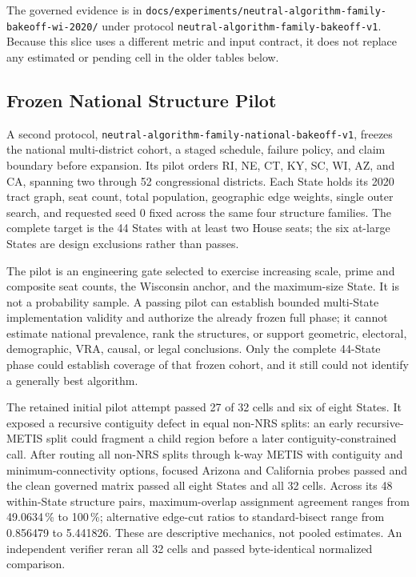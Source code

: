 The governed evidence is in
\nolinkurl{docs/experiments/neutral-algorithm-family-bakeoff-wi-2020/} under
protocol \texttt{neutral-algorithm-family-bakeoff-v1}. Because this slice uses
a different metric and input contract, it does not replace any estimated or
pending cell in the older tables below.

\subsection{Frozen National Structure Pilot}

A second protocol, \texttt{neutral-algorithm-family-national-bakeoff-v1},
freezes the national multi-district cohort, a staged schedule, failure policy,
and claim boundary before expansion. Its pilot orders RI, NE, CT, KY, SC, WI,
AZ, and CA, spanning two through 52 congressional districts. Each State holds
its 2020 tract graph, seat count, total population, geographic edge weights,
single outer search, and requested seed 0 fixed across the same four structure
families. The complete target is the 44 States with at least two House seats;
the six at-large States are design exclusions rather than passes.

The pilot is an engineering gate selected to exercise increasing scale, prime
and composite seat counts, the Wisconsin anchor, and the maximum-size State.
It is not a probability sample. A passing pilot can establish bounded
multi-State implementation validity and authorize the already frozen full
phase; it cannot estimate national prevalence, rank the structures, or support
geometric, electoral, demographic, VRA, causal, or legal conclusions. Only the
complete 44-State phase could establish coverage of that frozen cohort, and it
still could not identify a generally best algorithm.

The retained initial pilot attempt passed 27 of 32 cells and six of eight
States. It exposed a recursive contiguity defect in equal non-NRS splits: an
early recursive-METIS split could fragment a child region before a later
contiguity-constrained call. After routing all non-NRS splits through k-way
METIS with contiguity and minimum-connectivity options, focused Arizona and
California probes passed and the clean governed matrix passed all eight States
and all 32 cells. Across its 48 within-State structure pairs, maximum-overlap
assignment agreement ranges from 49.0634\,\% to 100\,\%; alternative edge-cut
ratios to standard-bisect range from 0.856479 to 5.441826. These are descriptive
mechanics, not pooled estimates. An independent verifier reran all 32 cells and
passed byte-identical normalized comparison.

